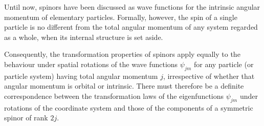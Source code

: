Until now, spinors have been discussed as wave functions for the intrinsic
angular momentum of elementary particles.  Formally, however, the spin of a
single particle is no different from the total angular momentum of any system
regarded as a whole, when its internal structure is set aside.

Consequently, the transformation properties of spinors apply equally to the
behaviour under spatial rotations of the wave functions $\psi_{jm}$ for any
particle (or particle system) having total angular momentum $j$, irrespective
of whether that angular momentum is orbital or intrinsic.  There must
therefore be a definite correspondence between the transformation laws of the
eigenfunctions $\psi_{jm}$ under rotations of the coordinate system and those
of the components of a symmetric spinor of rank $2j$.
